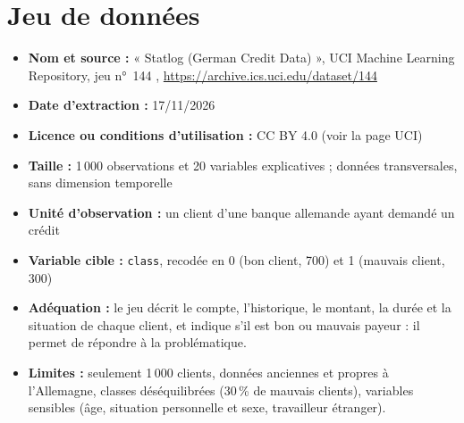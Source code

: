 \documentclass[11pt,a4paper]{article}
\begin{document}
\section{Jeu de données}
\label{sec:donnees}
\begin{itemize}
  \item \textbf{Nom et source :} « Statlog (German Credit Data) », UCI Machine Learning Repository, jeu n°~144 \cite{uci}, \url{https://archive.ics.uci.edu/dataset/144}
  \item \textbf{Date d'extraction :} 17/11/2026
  \item \textbf{Licence ou conditions d'utilisation :} CC BY 4.0 (voir la page UCI)
  \item \textbf{Taille :} 1\,000 observations et 20 variables explicatives ; données transversales, sans dimension temporelle
  \item \textbf{Unité d'observation :} un client d'une banque allemande ayant demandé un crédit
  \item \textbf{Variable cible :} \texttt{class}, recodée en 0 (bon client, 700) et 1 (mauvais client, 300)
  \item \textbf{Adéquation :} le jeu décrit le compte, l'historique, le montant, la durée et la situation de chaque client, et indique s'il est bon ou mauvais payeur : il permet de répondre à la problématique.
  \item \textbf{Limites :} seulement 1\,000 clients, données anciennes et propres à l'Allemagne, classes déséquilibrées (30\,\% de mauvais clients), variables sensibles (âge, situation personnelle et sexe, travailleur étranger).
\end{itemize}
\end{document}

